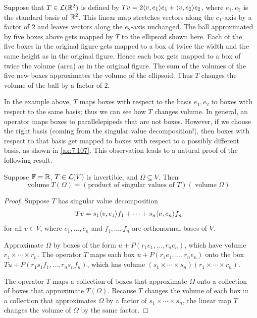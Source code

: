\begin{example}\label{ax:7.110}
Suppose that $T\in\mathcal{L}(\mathbb{R}^2)$ is defined by
$Tv=\allowbreak2\langle v, e_1 \rangle e_1+\langle v, e_2 \rangle e_2$, where $e_1,e_2$ is the standard basis of
$\mathbb{R}^2$. This linear map stretches vectors along the $e_1$-axis by a factor of
$2$ and leaves vectors along the $e_2$-axis unchanged. The ball approximated by
five boxes above gets mapped by $T$ to the ellipsoid shown here. Each of the
five boxes in the original figure gets mapped to a box of twice the width and
the same height as in the original figure. Hence each box gets mapped to a box
of twice the volume (area) as in the original figure. The sum of the volumes of
the five new boxes approximates the volume of the ellipsoid. Thus $T$ changes
the volume of the ball by a factor of $2$.
\end{example}

In the example above, $T$ maps boxes with respect to the basis $e_1,e_2$ to
boxes with respect to the same basis; thus we can see how $T$ changes volume.
In general, an operator maps boxes to parallelepipeds that are not boxes.
However, if we choose the right basis (coming from the singular value
decomposition!), then boxes with respect to that basis get mapped to boxes
with respect to a possibly different basis, as shown in \ref{ax:7.107}. This
observation leads to a natural proof of the following result.

\begin{result}\label{ax:7.111}
Suppose $\mathbb{F}=\mathbb{R}$, $T\in\mathcal{L}(V)$ is invertible, and $\Omega\subseteq V$. Then
\[ \operatorname{volume}T(\Omega)
   = (\text{product of singular values of }T)(\operatorname{volume}\Omega). \]
\end{result}

\begin{proof}
Suppose $T$ has singular value decomposition
\[ Tv = s_1\langle v, e_1 \rangle f_1+\cdots+s_n\langle v, e_n \rangle f_n \]
for all $v\in V$, where $e_1,\dots,e_n$ and $f_1,\dots,f_n$ are orthonormal
bases of $V$.

Approximate $\Omega$ by boxes of the form $u+P(r_1e_1,\dots,r_ne_n)$, which
have volume $r_1\times\cdots\times r_n$. The operator $T$ maps each box
$u+P(r_1e_1,\dots,r_ne_n)$ onto the box $Tu+P(r_1s_1f_1,\dots,r_ns_nf_n)$,
which has volume $(s_1\times\cdots\times s_n)(r_1\times\cdots\times r_n)$.

The operator $T$ maps a collection of boxes that approximate $\Omega$ onto a
collection of boxes that approximate $T(\Omega)$. Because $T$ changes the
volume of each box in a collection that approximates $\Omega$ by a factor of
$s_1\times\cdots\times s_n$, the linear map $T$ changes the volume of $\Omega$
by the same factor.
\end{proof}

